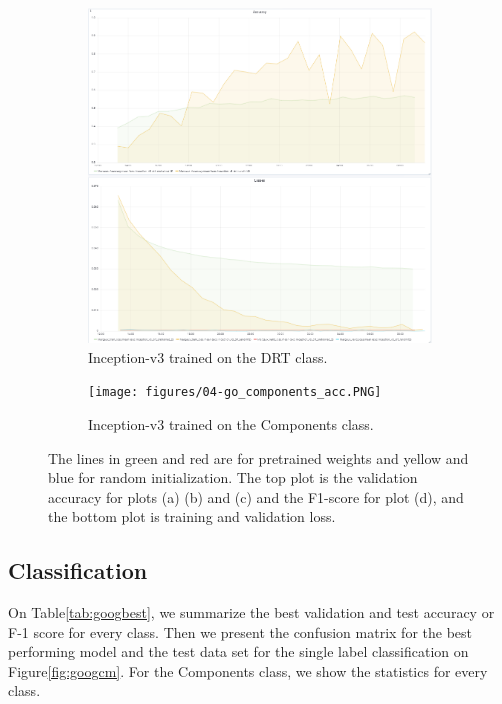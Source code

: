 \begin{figure}
\begin{subfigure}{.5\textwidth}
  \centering
  \includegraphics[width=.8\linewidth]{figures/04-go_drt_acc.PNG}
  \caption{Inception-v3 trained on the DRT class.}
  \label{fig:alexinit_drt}
\end{subfigure}%
\begin{subfigure}{.5\textwidth}
  \centering
  \texttt{[image: figures/04-go\_components\_acc.PNG]}
  \caption{Inception-v3 trained on the Components class.}
  \label{fig:alexinit_compo}
\end{subfigure}
\caption[Training and validation plots for Inception-v3]{The lines in green and red are for pretrained weights and yellow and blue for random initialization. The top plot is the validation accuracy for plots (a) (b) and (c) and the F1-score for plot (d), and the bottom plot is training  and validation loss.}
\label{fig:plotsgoog}
\end{figure}

\subsection{Classification}
On Table\ref{tab:googbest}, we summarize the best validation and test accuracy or F-1 score for every class. Then we present the confusion matrix for the best performing model and the test data set for the single label classification on Figure\ref{fig:googcm}. For the Components class, we show the statistics for every class. 

